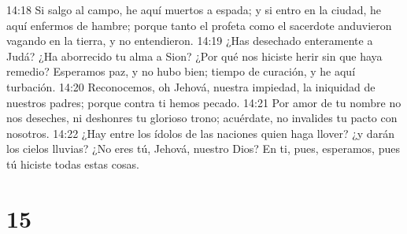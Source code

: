 14:18 Si salgo al campo, he aquí muertos a espada; y si entro en la ciudad, he aquí enfermos de hambre; porque tanto el profeta como el sacerdote anduvieron vagando en la tierra, y no entendieron.  
14:19 ¿Has desechado enteramente a Judá? ¿Ha aborrecido tu alma a Sion? ¿Por qué nos hiciste herir sin que haya remedio? Esperamos paz, y no hubo bien; tiempo de curación, y he aquí turbación.  
14:20 Reconocemos, oh Jehová, nuestra impiedad, la iniquidad de nuestros padres; porque contra ti hemos pecado.  
14:21 Por amor de tu nombre no nos deseches, ni deshonres tu glorioso trono; acuérdate, no invalides tu pacto con nosotros.  
14:22 ¿Hay entre los ídolos de las naciones quien haga llover? ¿y darán los cielos lluvias? ¿No eres tú, Jehová, nuestro Dios? En ti, pues, esperamos, pues tú hiciste todas estas cosas.  

\chapter{15}

